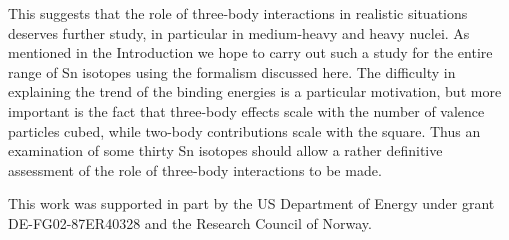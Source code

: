 \documentclass[prc,aps,amsmath,amssymb,preprintnumbers,showpacs,twocolumn]{revtex4}
\begin{document}
This suggests that the role of three-body interactions in realistic 
situations deserves further study, in particular in medium-heavy  and heavy nuclei. 
As mentioned in the Introduction we hope 
to carry out such a study for the entire range of Sn isotopes using the 
formalism discussed here. The difficulty in explaining the trend of the
binding energies is a particular motivation, but more important is the fact 
that three-body effects scale with the number of valence particles cubed, 
while two-body contributions scale with the square. Thus an examination of 
some thirty Sn isotopes should allow a rather definitive assessment of 
the role of three-body interactions to be made.  
  
\begin{acknowledgments}
This work was supported in part by the US Department of Energy under 
grant DE-FG02-87ER40328 and the Research Council of Norway.
\end{acknowledgments}
\end{document}
